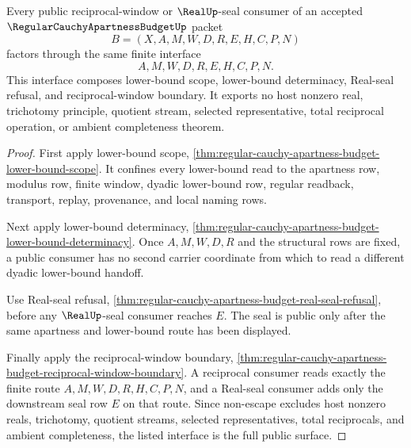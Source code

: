 \begin{theorem}
\label{thm:regular-cauchy-apartness-budget-public-interface}
Every public reciprocal-window or $\RealUp$-seal consumer of an accepted $\RegularCauchyApartnessBudgetUp$ packet
$$
B=(X,A,M,W,D,R,E,H,C,P,N)
$$
factors through the same finite interface
$$
A,M,W,D,R,E,H,C,P,N.
$$
This interface composes lower-bound scope, lower-bound determinacy, Real-seal refusal, and reciprocal-window boundary. It exports no host nonzero real, trichotomy principle, quotient stream, selected representative, total reciprocal operation, or ambient completeness theorem.
\end{theorem}
\begin{proof}
First apply lower-bound scope, \autoref{thm:regular-cauchy-apartness-budget-lower-bound-scope}. It confines every lower-bound read to the apartness row, modulus row, finite window, dyadic lower-bound row, regular readback, transport, replay, provenance, and local naming rows.

Next apply lower-bound determinacy, \autoref{thm:regular-cauchy-apartness-budget-lower-bound-determinacy}. Once $A,M,W,D,R$ and the structural rows are fixed, a public consumer has no second carrier coordinate from which to read a different dyadic lower-bound handoff.

Use Real-seal refusal, \autoref{thm:regular-cauchy-apartness-budget-real-seal-refusal}, before any $\RealUp$-seal consumer reaches $E$. The seal is public only after the same apartness and lower-bound route has been displayed.

Finally apply the reciprocal-window boundary, \autoref{thm:regular-cauchy-apartness-budget-reciprocal-window-boundary}. A reciprocal consumer reads exactly the finite route $A,M,W,D,R,H,C,P,N$, and a Real-seal consumer adds only the downstream seal row $E$ on that route. Since non-escape excludes host nonzero reals, trichotomy, quotient streams, selected representatives, total reciprocals, and ambient completeness, the listed interface is the full public surface.
\end{proof}

